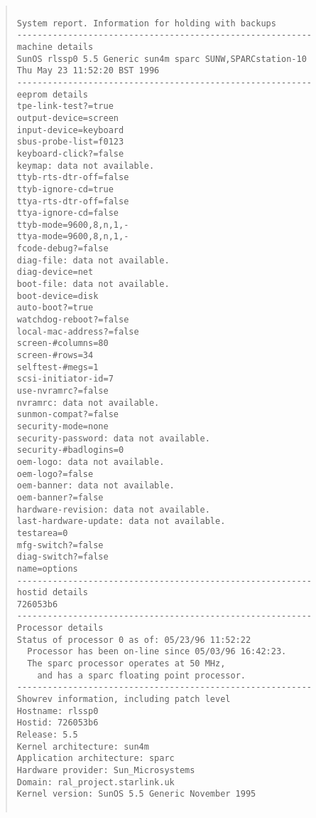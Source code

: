 \documentclass[11pt]{article}
\begin{document}
\begin{quote}
\begin{verbatim}

System report. Information for holding with backups
----------------------------------------------------------
machine details
SunOS rlssp0 5.5 Generic sun4m sparc SUNW,SPARCstation-10
Thu May 23 11:52:20 BST 1996
----------------------------------------------------------
eeprom details
tpe-link-test?=true
output-device=screen
input-device=keyboard
sbus-probe-list=f0123
keyboard-click?=false
keymap: data not available.
ttyb-rts-dtr-off=false
ttyb-ignore-cd=true
ttya-rts-dtr-off=false
ttya-ignore-cd=false
ttyb-mode=9600,8,n,1,-
ttya-mode=9600,8,n,1,-
fcode-debug?=false
diag-file: data not available.
diag-device=net
boot-file: data not available.
boot-device=disk
auto-boot?=true
watchdog-reboot?=false
local-mac-address?=false
screen-#columns=80
screen-#rows=34
selftest-#megs=1
scsi-initiator-id=7
use-nvramrc?=false
nvramrc: data not available.
sunmon-compat?=false
security-mode=none
security-password: data not available.
security-#badlogins=0
oem-logo: data not available.
oem-logo?=false
oem-banner: data not available.
oem-banner?=false
hardware-revision: data not available.
last-hardware-update: data not available.
testarea=0
mfg-switch?=false
diag-switch?=false
name=options
----------------------------------------------------------
hostid details
726053b6
----------------------------------------------------------
Processor details
Status of processor 0 as of: 05/23/96 11:52:22
  Processor has been on-line since 05/03/96 16:42:23.
  The sparc processor operates at 50 MHz,
	and has a sparc floating point processor.
----------------------------------------------------------
Showrev information, including patch level
Hostname: rlssp0
Hostid: 726053b6
Release: 5.5
Kernel architecture: sun4m
Application architecture: sparc
Hardware provider: Sun_Microsystems
Domain: ral_project.starlink.uk
Kernel version: SunOS 5.5 Generic November 1995


\end{verbatim}
\end{quote}
\end{document}

